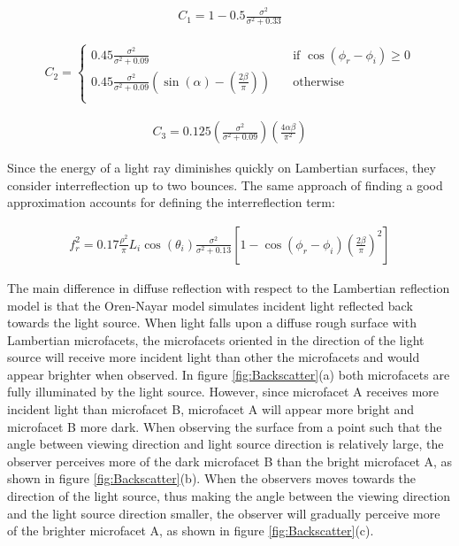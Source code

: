 	\begin{eqnarray*}
		C_1 = 1 - 0.5\frac{\sigma^2}{\sigma^2+0.33}
	\end{eqnarray*}

	\begin{eqnarray*}
		C_2 =
			\begin{cases}
				0.45\frac{\sigma^2}{\sigma^2+0.09} 		& \quad \text{if $\cos(\phi_r - \phi_i) \geq 0$}\\
				0.45\frac{\sigma^2}{\sigma^2+0.09} \left( \sin(\alpha) - \left( \frac{2\beta}{\pi}\right)\right) 	& \quad \text{otherwise}\\
			\end{cases}
	\end{eqnarray*}

	\begin{eqnarray*}
		C_3 = 0.125 \left( \frac{\sigma^2}{\sigma^2+0.09} \right)\left( \frac{4\alpha\beta}{\pi^2} \right)
	\end{eqnarray*}

\noindent Since the energy of a light ray diminishes quickly on Lambertian surfaces, they consider interreflection up to two bounces. The same approach of finding a good approximation accounts for defining the interreflection term:

	\begin{eqnarray*}
		f_r^2 = 0.17\frac{\rho^2}{\pi}L_i\cos(\theta_i)\frac{\sigma^2}{\sigma^2+0.13}\left[1-\cos(\phi_r-\phi_i)\left( \frac{2\beta}{\pi} \right)^2 \right]
	\end{eqnarray*}

The main difference in diffuse reflection with respect to the Lambertian reflection model is that the Oren-Nayar model simulates incident light reflected back towards the light source. When light falls upon a diffuse rough surface with Lambertian microfacets, the microfacets oriented in the direction of the light source will receive more incident light than other the microfacets and would appear brighter when observed. In figure \ref{fig:Backscatter}(a) both microfacets are fully illuminated by the light source. However, since microfacet A receives more incident light than microfacet B, microfacet A will appear more bright and microfacet B more dark. When observing the surface from a point such that the angle between viewing direction and light source direction is relatively large, the observer perceives more of the dark microfacet B than the bright microfacet A, as shown in figure \ref{fig:Backscatter}(b). When the observers moves towards the direction of the light source, thus making the angle between the viewing direction and the light source direction smaller, the observer will gradually perceive more of the brighter microfacet A, as shown in figure \ref{fig:Backscatter}(c).


